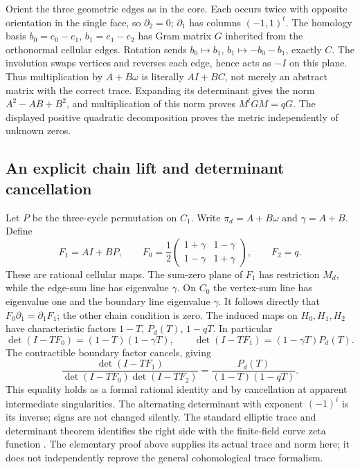 \documentclass[11pt]{article}
\theoremstyle{definition}\newtheorem{definition}[theorem]{Definition}
\theoremstyle{remark}\newtheorem{remark}[theorem]{Remark}
\begin{document}
Orient the three geometric edges as in the core. Each occurs twice with opposite orientation in the single face, so $\partial_2=0$; $\partial_1$ has columns $(-1,1)^t$. The homology basis $b_0=e_0-e_1$, $b_1=e_1-e_2$ has Gram matrix $G$ inherited from the orthonormal cellular edges. Rotation sends $b_0\mapsto b_1$, $b_1\mapsto-b_0-b_1$, exactly $C$. The involution swaps vertices and reverses each edge, hence acts as $-I$ on this plane. Thus multiplication by $A+B\omega$ is literally $AI+BC$, not merely an abstract matrix with the correct trace. Expanding its determinant gives the norm $A^2-AB+B^2$, and multiplication of this norm proves $M^tGM=qG$. The displayed positive quadratic decomposition proves the metric independently of unknown zeros.

\subsection{An explicit chain lift and determinant cancellation}
Let $P$ be the three-cycle permutation on $C_1$. Write $\pi_d=A+B\omega$ and $\gamma=A+B$. Define
\[
 F_1=AI+BP,\qquad
 F_0=\frac12\begin{pmatrix}1+\gamma&1-\gamma\\1-\gamma&1+\gamma\end{pmatrix},\qquad
 F_2=q.
\]
These are rational cellular maps. The sum-zero plane of $F_1$ has restriction $M_d$, while the edge-sum line has eigenvalue $\gamma$. On $C_0$ the vertex-sum line has eigenvalue one and the boundary line eigenvalue $\gamma$. It follows directly that $F_0\partial_1=\partial_1F_1$; the other chain condition is zero. The induced maps on $H_0,H_1,H_2$ have characteristic factors $1-T$, $P_d(T)$, $1-qT$. In particular
\[
 \det(I-TF_0)=(1-T)(1-\gamma T),\qquad
 \det(I-TF_1)=(1-\gamma T)P_d(T).
\]
The contractible boundary factor cancels, giving
\[
 \frac{\det(I-TF_1)}{\det(I-TF_0)\det(I-TF_2)}
 =\frac{P_d(T)}{(1-T)(1-qT)}.
\]
This equality holds as a formal rational identity and by cancellation at apparent intermediate singularities. The alternating determinant with exponent $(-1)^i$ is its inverse; signs are not changed silently. The standard elliptic trace and determinant theorem identifies the right side with the finite-field curve zeta function \cite{SGAFourHalf,DeligneWeilI}. The elementary proof above supplies its actual trace and norm here; it does not independently reprove the general cohomological trace formalism.
\end{document}
